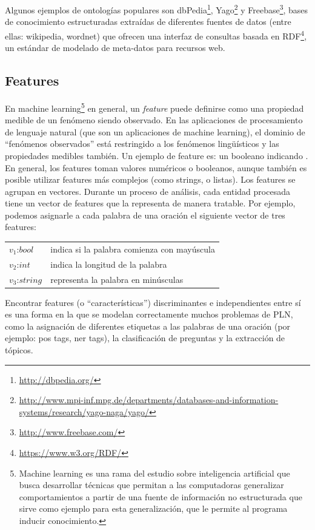 Algunos ejemplos de ontologías populares son dbPedia\footnote{\url{http://dbpedia.org/}}, Yago\footnote{\url{http://www.mpi-inf.mpg.de/departments/databases-and-information-systems/research/yago-naga/yago/}} y Freebase\footnote{\url{http://www.freebase.com/}}, bases de conocimiento estructuradas extraídas de diferentes fuentes de datos (entre ellas: wikipedia, wordnet) que ofrecen una interfaz de consultas basada en RDF\footnote{\url{https://www.w3.org/RDF/}}, un estándar de modelado de meta-datos para recursos web.


\subsection*{Features}
\label{subsec:features}

En machine learning\footnote{Machine learning es una rama del estudio sobre inteligencia artificial que busca desarrollar técnicas que permitan a las computadoras generalizar comportamientos a partir de una fuente de información no estructurada que sirve como ejemplo para esta generalización, que le permite al programa inducir conocimiento.} en general, un \textit{feature} puede definirse como una propiedad medible de un fenómeno siendo observado. En las aplicaciones de procesamiento de lenguaje natural (que son un aplicaciones de machine learning), el dominio de “fenómenos observados” está restringido a los fenómenos lingüísticos y las propiedades medibles también. Un ejemplo de feature es: un booleano indicando . En general, los features toman valores numéricos o booleanos, aunque también es posible utilizar features más complejos (como strings, o listas). Los features se agrupan en vectores. Durante un proceso de análisis, cada entidad procesada tiene un vector de features que la representa de manera tratable. Por ejemplo, podemos asignarle a cada palabra de una oración el siguiente vector de tres features:

\begin{center}
\begin{tabular}{ll}
$v_1$:$bool$ & indica si la palabra comienza con mayúscula \\
$v_2$:$int$ & indica la longitud de la palabra \\
$v_3$:$string$ & representa la palabra en minúsculas \\
\end{tabular}
\end{center}


Encontrar features (o “características”) discriminantes e independientes entre sí es una forma en la que se modelan correctamente muchos problemas de PLN, como la asignación de diferentes etiquetas a las palabras de una oración (por ejemplo: pos tags, ner tags), la clasificación de preguntas y la extracción de tópicos.

